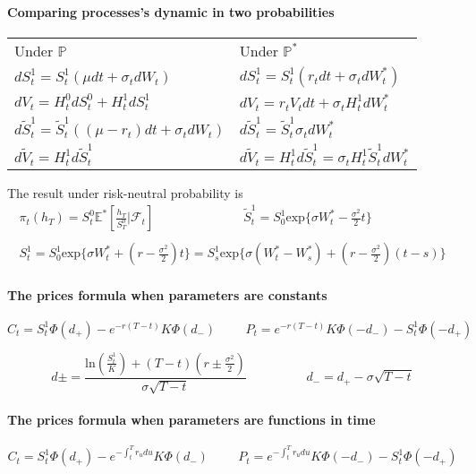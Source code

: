 \documentclass[a4paper,10pt]{article}
\begin{document}
\paragraph{Comparing processes's dynamic in two probabilities}
\begin{center}
\begin{tabular}{l|l}
 Under $\mathbb{P}$ & Under $\mathbb{P}^*$                                                      \\[6pt]
 $ dS^1_t = S^1_t( \mu dt + \sigma_t d W_t) $       &  $ dS^1_t = S^1_t( r_t dt + \sigma_t d W^*_t) $ \\[3pt]
 $ dV_t = H^0_t dS^0_t + H^1_t dS^1_t     $       &  $ dV_t = r_t V_t dt + \sigma_t H^1_t dW^*_t  $ \\[3pt]
 $ d\widetilde{S}^1_t = \widetilde{S}^1_t( (\mu-r_t)dt + \sigma_t dW_t ) $ & $d\widetilde{S}^1_t = \widetilde{S}^1_t \sigma_t dW^*_t  $ \\[3pt]
 $ d\widetilde{V}_t = H^1_t d\widetilde{S}^1_t $ & $d\widetilde{V}_t = H^1_t d\widetilde{S}^1_t =  \sigma_t H^1_t \widetilde{S}^1_t dW^*_t $
\end{tabular}
\end{center}
The result under risk-neutral probability is
\[
\begin{array}{l}
\pi_t(h_{T}) = S^0_t \mathbb{E}^*[\frac{h_T}{S^0_T} | \mathcal{F}_t]
\hspace{3cm}
\widetilde{S}^1_t = S^1_0\text{exp}\{ \sigma W^*_t -\frac{\sigma^2}{2}t\}  \\ \\
S^1_t = S^1_0\text{exp}\{  \sigma W^*_t + (r-\frac{\sigma^2}{2})t \} = S^1_s\text{exp}\{  \sigma (W^*_t - W^*_s) + (r-\frac{\sigma^2}{2})(t-s) \}
\end{array}
\]

\paragraph{The prices formula when parameters are constants}
\[
C_t = S^1_t \Phi(d_+) - e^{-r(T-t)} K \Phi(d_-)
\hspace{1cm}
P_t = e^{-r(T-t)} K \Phi(-d_-) - S^1_t \Phi(-d_+)
\]

\[
d\pm = \frac{ \text{ln}(\frac{S^1_t}{K}) + (T-t)( r\pm \frac{\sigma^2}{2})  }{\sigma \sqrt{T-t}} 
\hspace{2cm}
d_- = d_+  - \sigma \sqrt{T-t}
\]
\paragraph{The prices formula when parameters are functions in time}
\[
C_t = S^1_t \Phi(d_+) - e^{- \int^T_t r_udu } K \Phi(d_-)
\hspace{1cm}
P_t = e^{- \int^T_t r_udu } K \Phi(-d_-) - S^1_t \Phi(-d_+)
\]
\end{document}
